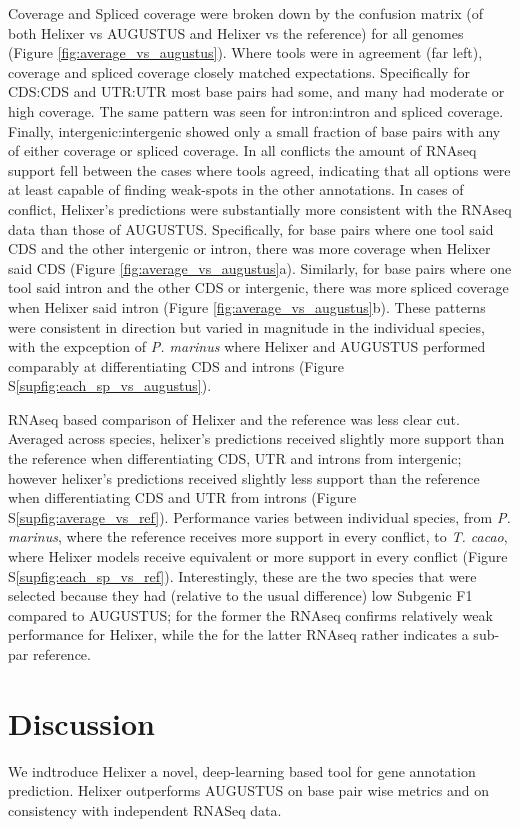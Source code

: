 \documentclass{bioinfo}
\newcounter{supfig}
\begin{document}
Coverage and Spliced coverage were broken down by the confusion matrix (of both
Helixer vs AUGUSTUS and Helixer vs the reference) for all genomes (Figure \ref{fig:average_vs_augustus}). %
Where tools were in agreement (far left), coverage and spliced coverage closely matched
expectations. Specifically for CDS:CDS and UTR:UTR most base pairs had some, and many
had moderate or high coverage. The same pattern was seen for intron:intron and spliced
coverage. Finally, intergenic:intergenic showed only a small fraction of base pairs with 
any of either coverage or spliced coverage. In all conflicts the amount of RNAseq support
fell between the cases where tools agreed, indicating that all options were at least
capable of finding weak-spots in the other annotations.
In cases of conflict, Helixer's predictions were substantially more consistent with
the RNAseq data than those of AUGUSTUS. Specifically, for base pairs where one tool said CDS and
the other intergenic or intron, there was more coverage when 
Helixer said CDS (Figure \ref{fig:average_vs_augustus}a). Similarly, for base pairs where one tool said intron and the other 
CDS or intergenic, there was more spliced coverage when Helixer said intron (Figure \ref{fig:average_vs_augustus}b). 
These patterns were consistent in direction but varied in magnitude in the individual species,
with the expception of {\it P. marinus} where Helixer and AUGUSTUS performed comparably
at differentiating CDS and introns (Figure S\ref{supfig:each_sp_vs_augustus}).

RNAseq based comparison of Helixer and the reference was less clear cut.
Averaged across species, helixer's predictions received slightly more support
than the reference when differentiating CDS, UTR and introns from intergenic;
however helixer's predictions received slightly less support than the reference 
when differentiating CDS and UTR from introns (Figure S\ref{supfig:average_vs_ref}). Performance varies between individual
species, from {\it P. marinus}, where the reference receives more support
in every conflict, to {\it T. cacao}, where Helixer models receive equivalent
or more support in every conflict (Figure S\ref{supfig:each_sp_vs_ref}). Interestingly, these are the two species that
were selected because they had (relative to the usual difference) low Subgenic F1 compared to 
AUGUSTUS; for the former the RNAseq confirms relatively weak performance for Helixer, while the 
for the latter RNAseq rather indicates a sub-par reference. 

\section{Discussion}
We indtroduce Helixer a novel, deep-learning based tool for gene annotation
prediction. Helixer outperforms AUGUSTUS on base pair wise metrics and on 
consistency with independent RNASeq data. 
\end{document}
